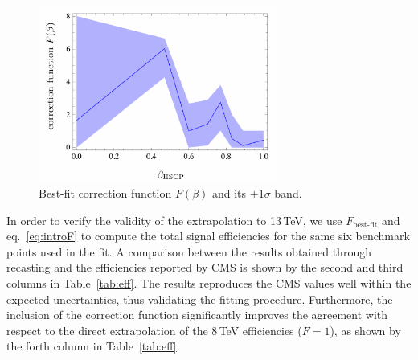 \begin{figure}[h]
\centering
\includegraphics[width=0.7\textwidth]{ch5-figures/HSCP_13TeV_fitB.pdf}
\caption{Best-fit correction function $F(\beta)$ and its $ \pm 1\sigma$ band.
}
\label{fig:F}
\end{figure}


In order to verify the validity of the extrapolation to 13\,TeV,
we use $F_\text{best-fit}$ and eq.~\ref{eq:introF} to compute the total signal
efficiencies for the same six benchmark points used in the fit. A comparison
between the results obtained through recasting and the efficiencies reported by
CMS is shown by the second and third columns in Table~\ref{tab:eff}.
The results reproduces the CMS values well within the expected uncertainties,
thus validating the fitting procedure.
Furthermore, the inclusion of the correction function significantly improves the
agreement with respect to the direct extrapolation of the 8\,TeV
efficiencies ($F=1$), as shown by the forth column in Table~\ref{tab:eff}.



